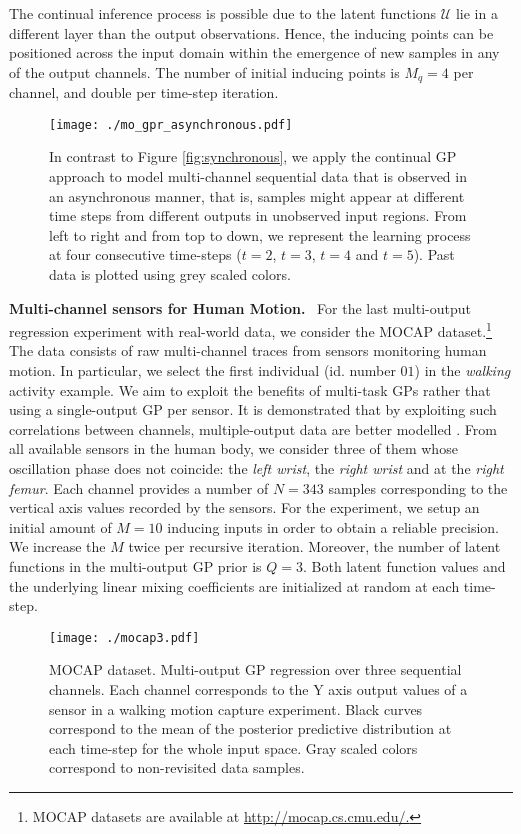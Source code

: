 \documentclass[]{article}
\newcommand{\Ucal}{\mathcal{U}}
\begin{document}
The continual inference process is possible due to the latent functions $\Ucal$ lie in a different layer than the output observations. Hence, the inducing points can be positioned across the input domain within the emergence of new samples in any of the output channels. The number of initial inducing points is $M_q = 4$ per channel, and double per time-step iteration.

\begin{figure}[] \label{fig:asynchronous}
	\centering
	\texttt{[image: ./mo\_gpr\_asynchronous.pdf]}
	\caption{In contrast to Figure \ref{fig:synchronous}, we apply the continual GP approach to model multi-channel sequential data that is observed in an asynchronous manner, that is, samples might appear at different time steps from different outputs in unobserved input regions. From left to right and from top to down, we represent the learning process at four consecutive time-steps ($t=2$, $t=3$, $t=4$ and $t=5$). Past data is plotted using grey scaled colors.}
	\label{fig:asynchronous}
\end{figure}

\textbf{Multi-channel sensors for Human Motion.}~ For the last multi-output regression experiment with real-world data, we consider the MOCAP dataset.\footnote{MOCAP datasets are available at \url{http://mocap.cs.cmu.edu/.}} The data consists of raw multi-channel traces from sensors monitoring human motion. In particular, we select the first individual (id. number $01$) in the \textit{walking} activity example. We aim to exploit the benefits of multi-task GPs rather that using a single-output GP per sensor. It is demonstrated that by exploiting such correlations between channels, multiple-output data are better modelled \citep{bonilla2008multi}. From all available sensors in the human body, we consider three of them whose oscillation phase does not coincide: the \textit{left wrist}, the \textit{right wrist} and at the \textit{right femur}. Each channel provides a number of $N=343$ samples corresponding to the vertical axis values recorded by the sensors. For the experiment, we setup an initial amount of $M=10$ inducing inputs in order to obtain a reliable precision. We increase the $M$ twice per recursive iteration. Moreover, the number of latent functions in the multi-output GP prior is $Q=3$. Both latent function values and the underlying linear mixing coefficients are initialized at random at each time-step.

\begin{figure}[] \centering
	\texttt{[image: ./mocap3.pdf]}
\caption{\textsc{MOCAP} dataset. Multi-output GP regression over three sequential channels. Each channel corresponds to the Y axis output values of a sensor in a walking motion capture experiment. Black curves correspond to the mean of the posterior predictive distribution at each time-step for the whole input space. Gray scaled colors correspond to non-revisited data samples.}
	\label{fig:mocap}
\end{figure}
\end{document}

